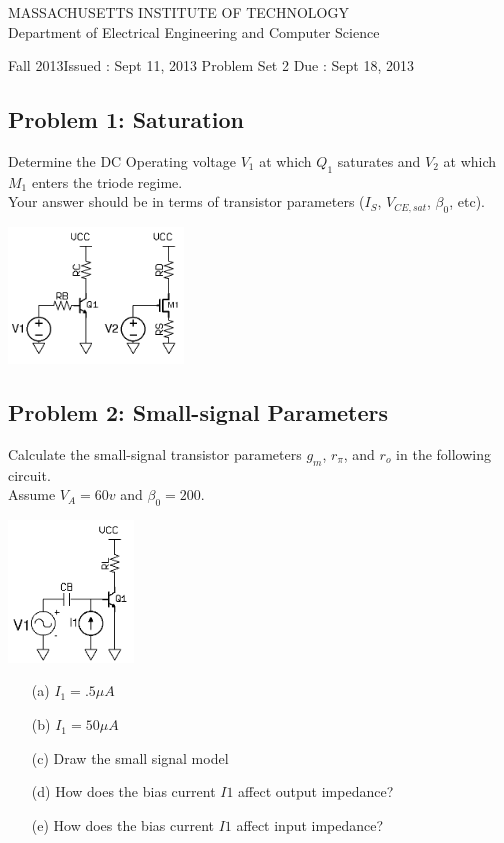 \documentclass[11pt,twoside]{article}
\newlength{\toppush}
\newcommand{\htitle}[3]{\begin{center}
\vspace*{-\toppush}
{\large MASSACHUSETTS INSTITUTE OF TECHNOLOGY}\\
{\small Department of Electrical Engineering and Computer Science}\\
\vspace*{1ex}{\Large #2}\end{center}
\noindent
\newline\parbox{6.5in}
{Fall 2013\hfill Issued : #1 \newline
 Problem Set 2 \hfill Due : #3\newline
}}
\newcommand{\handout}[3]{\thispagestyle{empty}
\pagestyle{myheadings}\htitle{#1}{#2}{#3}}
\begin{document}
\handout{Sept 11, 2013}{6.301 Solid State Circuits}{Sept 18, 2013}
\setlength{\parindent}{0pt}

\newcommand{\solution}{
 \medskip
 {\bf Solution:}
}

\hrulefill

\flushleft
\subsection*{Problem 1: Saturation}
Determine the DC Operating voltage $V_1$ at which $Q_1$ saturates and $V_2$ at which $M_1$ enters the triode regime. \\
Your answer should be in terms of transistor parameters ($I_S$, $V_{CE,sat}$, $\beta_0$, etc).

\begin{center}
\includegraphics[width=0.35\textwidth]{saturation.png}
\end{center}

\subsection*{Problem 2: Small-signal Parameters}
Calculate the small-signal transistor parameters $g_m$, $r_{\pi}$, and $r_o$ in the following circuit. \\
Assume $V_A = 60v$ and $\beta_0 = 200$.  \\

\begin{center}
\includegraphics[width=0.25\textwidth]{parameters.png}
\end{center}

\begin{enumerate}
\item[(a)] $I_1 = .5\mu A$
\item[(b)] $I_1 = 50\mu A$
\item[(c)] Draw the small signal model
\item[(d)] How does the bias current $I1$ affect output impedance?
\item[(e)] How does the bias current $I1$ affect input impedance?
\end{enumerate}
\end{document}
